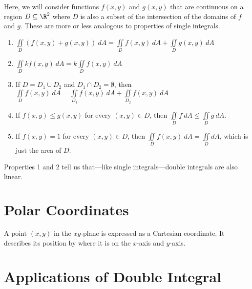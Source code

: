 Here, we will consider functions $f(x,y)$ and $g(x,y)$ that are continuous on a region $D \subseteq \R^2$ where $D$ is also a subset of the intersection of the domains of $f$ and $g$. These are more or less analogous to properties of single integrals.

\begin{enumerate}
    \item $\displaystyle \iint\limits_D (f(x,y) + g(x,y))\ dA = \iint\limits_D f(x,y)\ dA + \iint\limits_D g(x,y)\ dA $
    \item $\displaystyle \iint\limits_D k f(x,y)\ dA = k \iint\limits_D f(x,y)\ dA $
    \item If $D = D_1 \cup D_2$ and $D_1 \cap D_2 = \emptyset$, then $\displaystyle \iint\limits_D f(x,y)\ dA = \iint\limits_{D_1} f(x,y)\ dA + \iint\limits_{D_2} f(x,y)\ dA$
    \item If $f(x,y) \leq g(x,y)$ for every $(x,y) \in D$, then $\displaystyle \iint\limits_D f\ dA \leq \iint\limits_D g\ dA$.
    \item If $f(x,y) = 1$ for every $(x,y) \in D$, then $\displaystyle \iint\limits_D f(x,y)\ dA = \iint\limits_D dA$, which is just the area of $D$.
\end{enumerate}

Properties 1 and 2 tell us that---like single integrals---double integrals are also linear.

\section{Polar Coordinates}

A point $(x,y)$ in the $xy$-plane is expressed as a Cartesian coordinate. It describes its position by where it is on the $x$-axis and $y$-axis.


\section{Applications of Double Integral}

